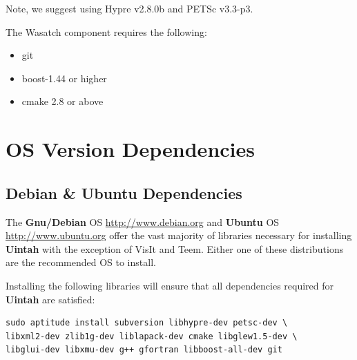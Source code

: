 \documentclass[12pt]{article}
\begin{document}
Note, we suggest using Hypre v2.8.0b and PETSc v3.3-p3. 

The Wasatch component requires the following:
\begin{itemize}
  \item git
  \item boost-1.44 or higher
  \item cmake 2.8 or above
\end{itemize}
\section{OS Version Dependencies}

\subsection{Debian \& Ubuntu Dependencies}
\label{sec:debian_dependencies}
The \textbf{Gnu/Debian} OS \url{http://www.debian.org} and
\textbf{Ubuntu} OS \url{http://www.ubuntu.org} offer the vast majority
of libraries necessary for installing \textbf{Uintah} with the
exception of VisIt and Teem.  Either one of these distributions are
the recommended OS to install.

Installing the following libraries will ensure that all dependencies
required for \textbf{Uintah} are satisfied:

\begin{verbatim} 
sudo aptitude install subversion libhypre-dev petsc-dev \ 
libxml2-dev zlib1g-dev liblapack-dev cmake libglew1.5-dev \
libglui-dev libxmu-dev g++ gfortran libboost-all-dev git
\end{verbatim}

  
\end{document}
